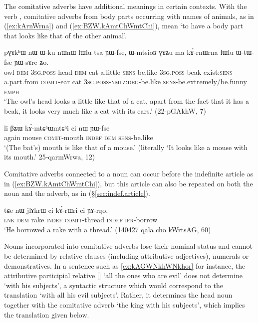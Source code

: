 The comitative adverbs have additional meanings in certain contexts. With the verb ,  comitative adverbs from body parts occurring with names of animals, as in (\ref{ex:kArnWrna}) and (\ref{ex:BZW.kAmtChWmtChi}), mean `to have a body part that looks like that of the other animal'.

\begin{exe}
	\ex \label{ex:kArnWrna}
	\gll pɣɤkʰɯ nɯ ɯ-ku nɯnɯ lɯlu tsa ɲɯ-fse, ɯ-mtsioʁ ɣɤʑu ma kɤ́-rnɯ\redp{}rna lɯlu ɯ-tɯ-fse ɲɯ-sɤre ʑo. \\
	owl \textsc{dem} \textsc{3sg}.\textsc{poss}-head \textsc{dem} cat a.little \textsc{sens}-be.like \textsc{3sg}.\textsc{poss}-beak exist:\textsc{sens} a.part.from \textsc{comit}-ear cat \textsc{3sg}.\textsc{poss}-\textsc{nmlz}:\textsc{deg}-be.like \textsc{sens}-be.extremely/be.funny \textsc{emph} \\
	\glt `The owl's head looks a little like that of a cat, apart from the fact that it has a beak, it looks very much like a cat with its ears.' (22-pGAkhW, 7)
\end{exe}

\begin{exe}
\ex \label{ex:BZW.kAmtChWmtChi}
\gll li βʑɯ kɤ́-mtɕʰɯ\redp{}mtɕʰi ci nɯ ɲɯ-fse  \\
again mouse \textsc{comit}-mouth \textsc{indef} \textsc{dem} \textsc{sens}-be.like \\
\glt `(The bat's) mouth is like that of a mouse.' (literally `It looks like a mouse with its mouth.' 25-qarmWrwa, 12)
\end{exe}

Comitative adverbs connected to a noun can occur before the indefinite article  as in (\ref{ex:BZW.kAmtChWmtChi}), but this article can also be repeated on both the noun and the adverb, as in (§\ref{sec:indef.article}).

\begin{exe}
\ex \label{ex:BZW.kArWri}
\gll tɕe nɯ jlɤkrɯ ci kɤ́-rɯ\redp{}ri ci ɲɤ-rŋo, \\
\textsc{lnk} \textsc{dem} rake \textsc{indef} \textsc{comit}-thread \textsc{indef} \textsc{ifr}-borrow \\
\glt  `He borrowed a rake with a thread.' (140427 qala cho kWrtsAG, 60)
\end{exe}

Nouns incorporated into comitative adverbs lose their nominal status and cannot be determined by relative clauses (including attributive adjectives), numerals or demonstratives. In a sentence such as \ref{ex:kAGWNkhWNkhor} for instance, the attributive participial relative [] `all the ones who are evil' does not determine  `with his subjects', a syntactic structure which would correspond to the translation `with all his evil subjects'. Rather, it determines the head noun together with the comitative adverb    `the king with his subjects', which implies the translation given below.

